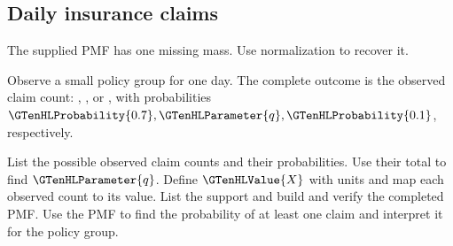 \subsection{Daily insurance claims}
\label{subsec:t2-c1-daily-insurance-claims}
The supplied PMF has one missing mass. Use normalization to recover it.

Observe a small policy group for one day. The complete outcome is the observed claim count: , , or , with probabilities $\GTenHLProbability{0.7},\GTenHLParameter{q},\GTenHLProbability{0.1}$, respectively.

    {List the possible observed claim counts and their probabilities. Use their total to find $\GTenHLParameter{q}$.}
    {Define $\GTenHLValue{X}$ with units and map each observed count to its value. List the support and build and verify the completed PMF.}
    {Use the PMF to find the probability of at least one claim and interpret it for the policy group.}

